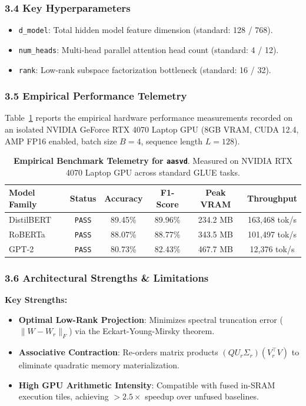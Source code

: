 \subsubsection*{3.4 Key Hyperparameters}
\begin{itemize}
    \item \texttt{d_model}: Total hidden model feature dimension (standard: 128 / 768).
    \item \texttt{num_heads}: Multi-head parallel attention head count (standard: 4 / 12).
    \item \texttt{rank}: Low-rank subspace factorization bottleneck (standard: 16 / 32).
\end{itemize}

\subsubsection*{3.5 Empirical Performance Telemetry}
Table~\ref{tab:telemetry_aasvd} reports the empirical hardware performance measurements recorded on an isolated NVIDIA GeForce RTX 4070 Laptop GPU (8GB VRAM, CUDA 12.4, AMP FP16 enabled, batch size $B=4$, sequence length $L=128$).

\begin{table}[h]
\centering
\small
\caption{\textbf{Empirical Benchmark Telemetry for \texttt{aasvd}}. Measured on NVIDIA RTX 4070 Laptop GPU across standard GLUE tasks.}
\label{tab:telemetry_aasvd}
\begin{tabular*}{\columnwidth}{@{\extracolsep{\fill}}lccccc}
\toprule
\textbf{Model Family} & \textbf{Status} & \textbf{Accuracy} & \textbf{F1-Score} & \textbf{Peak VRAM} & \textbf{Throughput} \\
\midrule
DistilBERT & \texttt{PASS} & 89.45\% & 89.96\% & 234.2 MB & 163,468 tok/s \\
RoBERTa & \texttt{PASS} & 88.07\% & 88.77\% & 343.5 MB & 101,497 tok/s \\
GPT-2 & \texttt{PASS} & 80.73\% & 82.43\% & 467.7 MB & 12,376 tok/s \\
\bottomrule
\end{tabular*}
\end{table}

\subsubsection*{3.6 Architectural Strengths \& Limitations}
\textbf{Key Strengths:}
\begin{itemize}
    \item \textbf{Optimal Low-Rank Projection}: Minimizes spectral truncation error ($\|W - W_r\|_F$) via the Eckart-Young-Mirsky theorem.
    \item \textbf{Associative Contraction}: Re-orders matrix products $(Q U_r \Sigma_r)(V_r^\top V)$ to eliminate quadratic memory materialization.
    \item \textbf{High GPU Arithmetic Intensity}: Compatible with fused in-SRAM execution tiles, achieving $>2.5\times$ speedup over unfused baselines.
\end{itemize}

